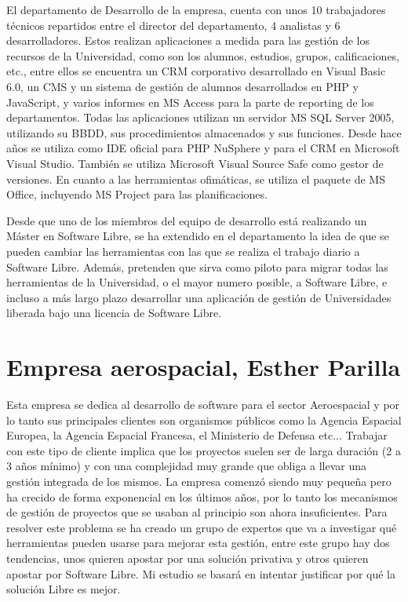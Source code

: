 \documentclass[a4paper]{article}
\begin{document}
El departamento de Desarrollo de la empresa, cuenta con unos 10 trabajadores
técnicos repartidos entre el director del departamento, 4 analistas y 6
desarrolladores. Estos realizan aplicaciones a medida para las gestión de
los recursos de la Universidad, como son los alumnos, estudios, grupos,
calificaciones, etc., entre ellos se encuentra un CRM corporativo
desarrollado en Visual Basic 6.0, un CMS y un sistema de gestión de alumnos
desarrollados en PHP y JavaScript, y varios informes en MS Access para la
parte de reporting de los departamentos. Todas las aplicaciones utilizan un
servidor MS SQL Server 2005, utilizando su BBDD, sus procedimientos
almacenados y sus funciones. Desde hace años se utiliza como IDE oficial
para PHP NuSphere y para el CRM en Microsoft Visual Studio. También se
utiliza Microsoft Visual Source Safe como gestor de versiones. En cuanto a
las herramientas ofimáticas, se utiliza el paquete de MS Office, incluyendo
MS Project para las planificaciones.

 Desde que uno de los miembros del equipo de desarrollo está realizando un
Máster en Software Libre, se ha extendido en el departamento la idea de que
se pueden cambiar las herramientas con las que se realiza el trabajo diario
a Software Libre. Además, pretenden que sirva como piloto para migrar todas
las herramientas de la Universidad, o el mayor numero posible, a Software
Libre, e incluso a más largo plazo desarrollar una aplicación de gestión de
Universidades liberada bajo una licencia de Software Libre.

 \section{Empresa aerospacial, Esther Parilla}

Esta empresa se dedica al desarrollo de software para el sector Aeroespacial
y por lo tanto sus principales clientes son organismos públicos como la
Agencia Espacial Europea, la Agencia Espacial Francesa, el Ministerio de
Defensa etc... Trabajar con este tipo de cliente implica que los proyectos
suelen ser de larga duración (2 a 3 años mínimo) y con una complejidad muy
grande que obliga a llevar una gestión integrada de los mismos.
La empresa comenzó siendo muy pequeña pero ha crecido de forma exponencial
en los últimos años, por lo tanto los mecanismos de gestión de proyectos que
se usaban al principio son ahora insuficientes.
Para resolver este problema se ha creado un grupo de expertos que va a
investigar qué herramientas pueden usarse para mejorar esta gestión, entre
este grupo hay dos tendencias, unos quieren apostar por una solución
privativa y otros quieren apostar por Software Libre. Mi estudio se basará
en intentar justificar por qué la solución Libre es mejor.
\end{document}
